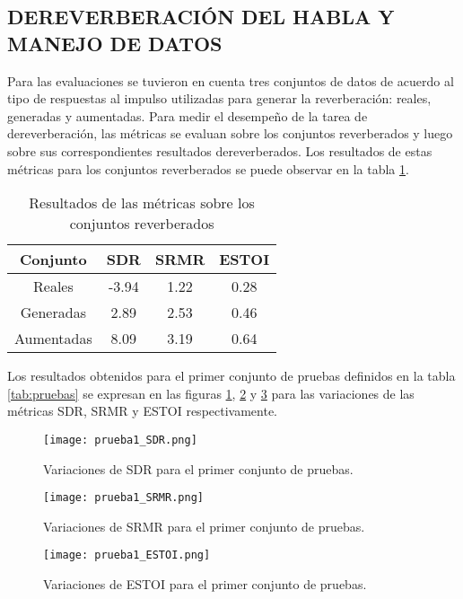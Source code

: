 \subsection[Dereverberación del habla y manejo de datos]{DEREVERBERACIÓN DEL HABLA Y MANEJO DE DATOS}

Para las evaluaciones se tuvieron en cuenta tres conjuntos de datos de acuerdo al tipo de respuestas al impulso utilizadas para generar la reverberación: reales, generadas y aumentadas. Para medir el desempeño de la tarea de dereverberación, las métricas se evaluan sobre los conjuntos reverberados y luego sobre sus correspondientes resultados dereverberados. Los resultados de estas métricas para los conjuntos reverberados se puede observar en la tabla \ref{table:resultados_reverb}. 

\begin{table}[H]
\centering
\caption{Resultados de las métricas sobre los conjuntos reverberados}
\begin{tabular}{|c|c|c|c|}
\hline
Conjunto   & \textbf{SDR} & \textbf{SRMR} & \textbf{ESTOI} \\ \hline
Reales     & -3.94        & 1.22          & 0.28           \\
Generadas  & 2.89        & 2.53          & 0.46           \\
Aumentadas & 8.09        & 3.19          & 0.64           \\ \hline
\end{tabular}
\label{table:resultados_reverb}
\end{table}


Los resultados obtenidos para el primer conjunto de pruebas definidos en la tabla \ref{tab:pruebas} se expresan en las figuras \ref{fig:1_SDR}, \ref{fig:1_SRMR} y \ref{fig:1_ESTOI} para las variaciones de las métricas SDR, SRMR y ESTOI respectivamente. 

\begin{figure}[H]
	\centering{}
	\texttt{[image: prueba1\_SDR.png]}
	\caption{Variaciones de SDR para el primer conjunto de pruebas.}
	\label{fig:1_SDR}
\end{figure}

\begin{figure}[H]
	\centering{}
	\texttt{[image: prueba1\_SRMR.png]}
	\caption{Variaciones de SRMR para el primer conjunto de pruebas.}
	\label{fig:1_SRMR}
\end{figure}

\begin{figure}[H]
	\centering{}
	\texttt{[image: prueba1\_ESTOI.png]}
	\caption{Variaciones de ESTOI para el primer conjunto de pruebas.}
	\label{fig:1_ESTOI}
\end{figure}

